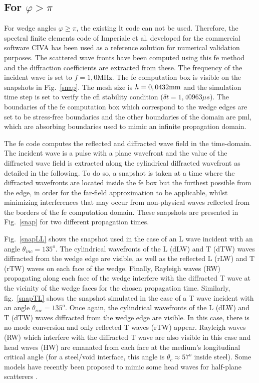 \subsection{For $\varphi>\pi$}
For wedge angles $\varphi \geq \pi$, the existing \acrshort{lt} code can not be used. Therefore, the spectral finite elements code of Imperiale et al. developed for the commercial software CIVA \cite{imperiale_ut_2016, imperiale_ut_2017} has been used as a reference solution for numerical validation purposes. The scattered wave fronts have been computed using this \acrfull{fe} method and the diffraction coefficients are extracted from these. The frequency of the incident wave is set to $f=1,0$MHz. The \acrshort{fe} computation box is visible on the snapshots in Fig.~\ref{snap}. The mesh size is $h=0,0432 \rm mm$ and the simulation time step is set to verify the \acrfull{cfl} stability condition ($\delta t=1,40963 \mu s$). The boundaries of the \acrshort{fe} computation box which correspond to the wedge edges are set to be stress-free boundaries and the other boundaries of the domain are \acrfull{pml}, which are absorbing boundaries used to mimic an infinite propagation domain.

The \acrshort{fe} code computes the reflected and diffracted wave field in the time-domain. The incident wave is a pulse with a plane wavefront and the value of the diffracted wave field is extracted along the cylindrical diffracted wavefront as detailed in the following. To do so, a snapshot is taken at a time where the diffracted wavefronts are located inside the \acrshort{fe} box but the furthest possible from the edge, in order for the far-field approximation to be applicable, whilst minimizing interferences that may occur from non-physical waves reflected from the borders of the \acrshort{fe} computation domain. These snapshots are presented in Fig.~\ref{snap} for two different propagation times. 

Fig.~\ref{snapLL} shows the snapshot used in the case of an L wave incident with an angle $\theta_{inc}=135^o$. The cylindrical wavefronts of the L (dLW) and T (dTW) waves diffracted from the wedge edge are visible, as well as the reflected L (rLW) and T (rTW) waves on each face of the wedge. Finally, Rayleigh waves (RW) propagating along each face of the wedge interfere with the diffracted T wave at the vicinity of the wedge faces for the chosen propagation time. 
Similarly, fig.~\ref{snapTL} shows the snapshot simulated in the case of a T wave incident with an angle $\theta_{inc}=135^o$. Once again, the cylindrical wavefronts of the L (dLW) and T (dTW) waves diffracted from the wedge edge are visible. In this case, there is no mode conversion and only reflected T waves (rTW) appear. Rayleigh waves (RW) which interfere with the diffracted T wave are also visible in this case and head waves (HW) are emanated from each face at the medium's longitudinal critical angle (for a steel/void interface, this angle is $\theta_c \approx 57^o$  inside steel). Some models have recently been proposed to mimic some head waves for half-plane scatterers \cite{PTDdarmon, FradkinDarmon}.

